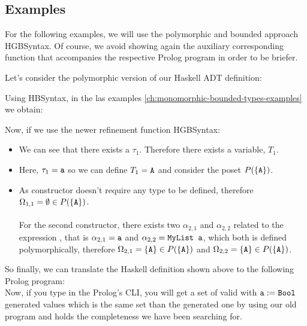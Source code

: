 	\subsection{Examples} \label{ch:polymorphic-types-examples}
	For the following examples, we will use the polymorphic and bounded approach HGBSyntax. Of course, we avoid showing again the auxiliary corresponding function that accompanies the respective Prolog program in order to be briefer.
	\begin{example}[MyList]
		Let's consider the polymorphic version of our  Haskell ADT definition:
		
		Using HBSyntax, in the las examples \ref{ch:monomorphic-bounded-types-examples} we obtain:
		
		Now, if we use the newer refinement function HGBSyntax:
		\begin{itemize}
			\item We can see that there exists a $\tau_1$. Therefore there exists a variable, $T_1$.
			\item Here, $\tau_1 = \texttt{a}$ so we can define $T_1 = \texttt{A}$ and consider the poset $P(\{\texttt{A}\})$.
			\item As  constructor doesn't require any type to be defined, therefore $\Omega_{1,1} = \emptyset \in P(\{ \texttt{A} \})$. \\\\
			      For the second constructor, there exists two $\alpha_{2,1}$ and $\alpha_{2,2}$ related to the expression , that is $\alpha_{2,1} = \texttt{a}$ and $\alpha_{2,2} = \texttt{MyList a}$, which both is defined polymorphically, therefore $\Omega_{2,1} = \{\texttt{A}\} \in P(\{ \texttt{A} \})$ and $\Omega_{2,2} = \{\texttt{A}\} \in P(\{ \texttt{A} \})$.
		\end{itemize}
		So finally, we can translate the Haskell definition shown above to the following Prolog program:\\
		
		Now, if you type  in the Prolog's CLI, you will get a set of valid  with $\texttt{a} := \texttt{Bool}$ generated values which is the same set than the generated one by using our old  program and holds the completeness we have been searching for.\\
	\end{example}
